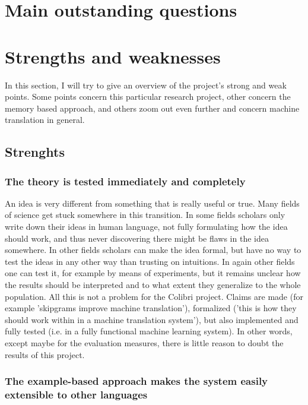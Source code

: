 \documentclass[12pt]{article}
\begin{document}
\section{Main outstanding questions}






\section{Strengths and weaknesses}

In this section, I will try to give an overview of the project's strong and weak points. Some points concern this particular research project, other concern the memory based approach, and others zoom out even further and concern machine translation in general.

\subsection{Strenghts}

\subsubsection{The theory is tested immediately and completely}

An idea is very different from something that is really useful or true. Many fields of science get stuck somewhere in this transition. In some fields scholars only write down their ideas in human language, not fully formulating how the idea should work, and thus never discovering there might be flaws in the idea somewhere. In other fields scholars can make the idea formal, but have no way to test the ideas in any other way than trusting on intuitions. In again other fields one can test it, for example by means of experiments, but it remains unclear how the results should be interpreted and to what extent they generalize to the whole population. All this is not a problem for the Colibri project. Claims are made (for example 'skipgrams improve machine translation'), formalized ('this is how they should work within in a machine translation system'), but also implemented and fully tested (i.e. in a fully functional machine learning system). In other words, except maybe for the evaluation measures, there is little reason to doubt the results of this project. 

\subsubsection{The example-based approach makes the system easily extensible to other languages}
\end{document}
